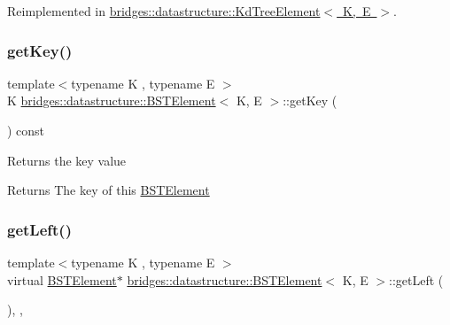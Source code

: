 Reimplemented in \mbox{\hyperlink{classbridges_1_1datastructure_1_1_kd_tree_element_a5413ecaf152e3df5fb45dd85da812888}{bridges\+::datastructure\+::\+Kd\+Tree\+Element$<$ K, E $>$}}.

\mbox{\label{classbridges_1_1datastructure_1_1_b_s_t_element_a66bd1d5874e4e0c8048e03e5fff07f86}} 
\subsubsection{\texorpdfstring{get\+Key()}{getKey()}}
{\footnotesize\ttfamily template$<$typename K , typename E $>$ \\
K \mbox{\hyperlink{classbridges_1_1datastructure_1_1_b_s_t_element}{bridges\+::datastructure\+::\+B\+S\+T\+Element}}$<$ K, E $>$\+::get\+Key (\begin{DoxyParamCaption}{ }\end{DoxyParamCaption}) const\hspace{0.3cm}{\ttfamily [inline]}}

Returns the key value \begin{DoxyReturn}{Returns}
The key of this \mbox{\hyperlink{classbridges_1_1datastructure_1_1_b_s_t_element}{B\+S\+T\+Element}} 
\end{DoxyReturn}
\mbox{\label{classbridges_1_1datastructure_1_1_b_s_t_element_af863c624691c11db26ae3b6d723d1f5c}} 
\subsubsection{\texorpdfstring{get\+Left()}{getLeft()}\hspace{0.1cm}{\footnotesize\ttfamily [1/2]}}
{\footnotesize\ttfamily template$<$typename K , typename E $>$ \\
virtual \mbox{\hyperlink{classbridges_1_1datastructure_1_1_b_s_t_element}{B\+S\+T\+Element}}$\ast$ \mbox{\hyperlink{classbridges_1_1datastructure_1_1_b_s_t_element}{bridges\+::datastructure\+::\+B\+S\+T\+Element}}$<$ K, E $>$\+::get\+Left (\begin{DoxyParamCaption}{ }\end{DoxyParamCaption})\hspace{0.3cm}{\ttfamily [inline]}, {\ttfamily [override]}, {\ttfamily [virtual]}}

